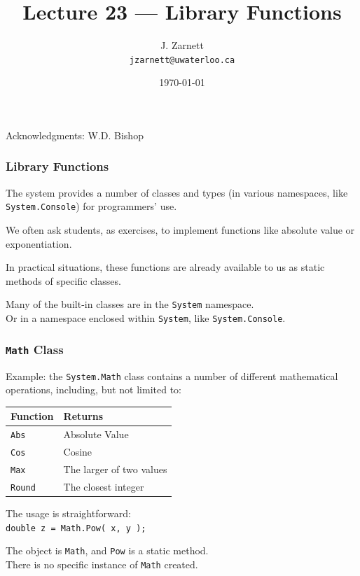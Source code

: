 

\title{Lecture 23 --- Library Functions }

\author{J. Zarnett\\
\texttt{jzarnett@uwaterloo.ca}}
\date{\today}



\begin{frame}
  \titlepage
  
  \begin{center}
  \small{Acknowledgments: W.D. Bishop}
  \end{center}
\end{frame}


\begin{frame}
\frametitle{Library Functions}
The system provides a number of classes and types (in various namespaces, like \texttt{System.Console}) for programmers' use.

We often ask students, as exercises, to implement functions like absolute value or exponentiation.

In practical situations, these functions are already available to us as static methods of specific classes.

Many of the built-in classes are in the \texttt{System} namespace.\\
\quad Or in a namespace enclosed within \texttt{System}, like \texttt{System.Console}.

\end{frame}

\begin{frame}
\frametitle{\texttt{Math} Class}
Example: the \texttt{System.Math} class contains a number of different mathematical operations, including, but not limited to:

\begin{center}
\begin{tabular}{l l}
\textbf{Function} & \textbf{Returns}\\ \hline
\texttt{Abs} & Absolute Value\\
\texttt{Cos} & Cosine\\
\texttt{Max} & The larger of two values\\
\texttt{Round} & The closest integer\\
\end{tabular}
\end{center}

The usage is straightforward:\\
\quad \texttt{double z = Math.Pow( x, y );}

The object is \texttt{Math}, and \texttt{Pow} is a static method. \\
\quad There is no specific instance of \texttt{Math} created.

\end{frame}

